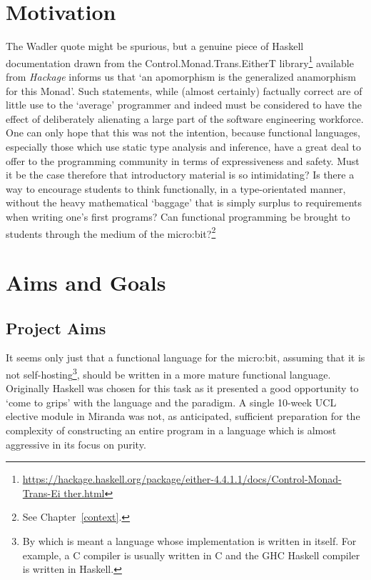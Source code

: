 \documentclass[12pt, a4paper]{report}
\begin{document}
\section{Motivation} 
The Wadler quote might be spurious, but a genuine piece of
Haskell documentation drawn from the Control.Monad.Trans.EitherT
library\footnote{\url{https://hackage.haskell.org/package/either-4.4.1.1/docs/Control-Monad-Trans-Ei
ther.html}} available from \textit{Hackage} informs us that `an apomorphism is the generalized
anamorphism for this Monad'. Such statements, while (almost certainly) factually correct are
of little use to the `average' programmer and indeed must be considered to have the effect of
deliberately alienating a large part of the software engineering workforce. One can only hope
that this was not the intention, because functional languages, especially those which use static
type analysis and inference, have a great deal to offer to the programming community in terms
of expressiveness and safety. Must it be the case therefore that introductory material is so
intimidating? Is there a way to encourage students to think functionally, in a type-orientated
manner, without the heavy mathematical `baggage' that is simply surplus to requirements when writing
one's first programs? Can functional programming be brought to students through the medium of the
micro:bit?\footnote{See Chapter~\ref{context}.}

\section{Aims and Goals}
\subsection{Project Aims}
It seems only just that a functional language for the micro:bit, assuming that it is not
self-hosting\footnote{By which is meant a language whose implementation is written in itself. For
example, a C compiler is usually written in C and the GHC Haskell compiler is written in Haskell.},
should be written in a more mature functional language. Originally Haskell was chosen for this task as it
presented a good opportunity to `come to grips' with the language and the paradigm. A single 10-week
UCL elective module in Miranda was not, as anticipated, sufficient preparation for the complexity of
constructing an entire program in a language which is almost aggressive in its focus on purity.
\end{document}

